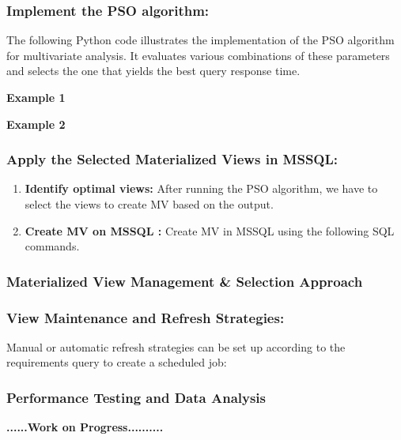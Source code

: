   

  
  
\subsubsection{Implement the PSO algorithm:}
 The following Python code illustrates the implementation of the PSO algorithm for multivariate analysis. It evaluates various combinations of these parameters and selects the one that yields the best query response time.\vspace{.4cm}

\textbf{Example 1}

  \vspace{.4cm}

\textbf{Example 2}
  \vspace{.4cm}
  
\subsubsection{Apply the Selected  Materialized Views in MSSQL:}

\begin{enumerate}
    \item \textbf{Identify optimal views:} After running the PSO algorithm, we have to select the views to create MV based on the output.
    \item \textbf{ Create MV on MSSQL :} Create MV in MSSQL using the following SQL commands.
    
   
    
\end{enumerate}


\subsubsection{Materialized View Management \& Selection Approach}
\subsubsection{View Maintenance and Refresh Strategies:} Manual or automatic refresh strategies can be set up according to the requirements query to create a scheduled job:



\subsubsection{Performance Testing and Data Analysis}

\textbf{......\textbf{Work on Progress}..........}       

